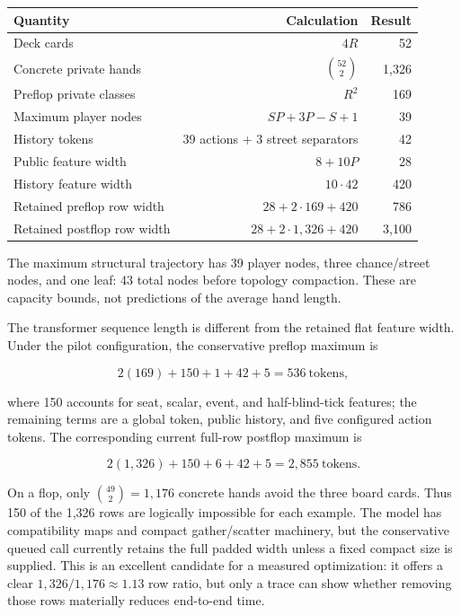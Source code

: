 \documentclass[
  10pt,
  letterpaper,
]{article}
\newcounter{none} %
\begin{document}
{\def\LTcaptype{none} %
\begin{longtable}[]{@{}lrr@{}}
\toprule\noalign{}
Quantity & Calculation & Result \\
\midrule\noalign{}
\endhead
\bottomrule\noalign{}
\endlastfoot
Deck cards & \(4R\) & 52 \\
Concrete private hands & \(\binom{52}{2}\) & 1,326 \\
Preflop private classes & \(R^2\) & 169 \\
Maximum player nodes & \(SP+3P-S+1\) & 39 \\
History tokens & 39 actions + 3 street separators & 42 \\
Public feature width & \(8+10P\) & 28 \\
History feature width & \(10\cdot42\) & 420 \\
Retained preflop row width & \(28+2\cdot169+420\) & 786 \\
Retained postflop row width & \(28+2\cdot1,326+420\) & 3,100 \\
\end{longtable}
}

The maximum structural trajectory has 39 player nodes, three
chance/street nodes, and one leaf: 43 total nodes before topology
compaction. These are capacity bounds, not predictions of the average
hand length.

The transformer sequence length is different from the retained flat
feature width. Under the pilot configuration, the conservative preflop
maximum is

\[
2(169)+150+1+42+5=536\ \text{tokens},
\]

where 150 accounts for seat, scalar, event, and half-blind-tick
features; the remaining terms are a global token, public history, and
five configured action tokens. The corresponding current full-row
postflop maximum is

\[
2(1,326)+150+6+42+5=2,855\ \text{tokens}.
\]

On a flop, only \(\binom{49}{2}=1,176\) concrete hands avoid the three
board cards. Thus 150 of the 1,326 rows are logically impossible for
each example. The model has compatibility maps and compact
gather/scatter machinery, but the conservative queued call currently
retains the full padded width unless a fixed compact size is supplied.
This is an excellent candidate for a measured optimization: it offers a
clear \(1,326/1,176\approx1.13\) row ratio, but only a trace can show
whether removing those rows materially reduces end-to-end time.
\end{document}
